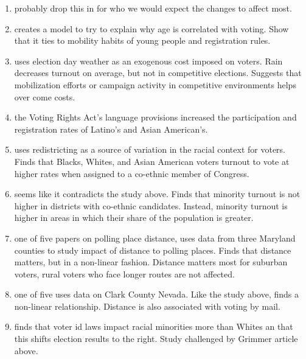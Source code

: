 \documentclass[12pt]{article}
\begin{document}
\begin{enumerate}
\item \citet{verba1995voice} probably drop this in for who we would expect the changes to affect most. 

\item \citet{ansolabehere2012movers} creates a model to try to explain why age is correlated with voting. Show that it ties to mobility habits of young people and registration rules. 

\item \citet{fraga2010voting} uses election day weather as an exogenous cost imposed on voters. Rain decreases turnout on average, but not in competitive elections. Suggests that mobilization efforts or campaign activity in competitive environments helps over come costs. 

\item \citet{fraga2016examining} the Voting Rights Act's language provisions increased the participation and registration rates of Latino's and Asian American's. 

\item \citet{fraga2016redistricting} uses redistricting as a source of variation in the racial context for voters. Finds that Blacks, Whites, and Asian American voters turnout to vote at higher rates when assigned to a co-ethnic member of Congress. 

\item \citet{fraga2016candidates} seems like it contradicts the study above. Finds that minority turnout is not higher in districts with co-ethnic candidates. Instead, minority turnout is higher in areas in which their share of the population is greater. 

\item \citet{gimpel2003political} one of five papers on polling place distance, uses data from three Maryland counties to study impact of distance to polling places. Finds that distance matters, but in a non-linear fashion. Distance matters most for suburban voters, rural voters who face longer routes are not affected. 

\item \citet{dyck2005distance} one of five uses data on Clark County Nevada. Like the study above, finds a non-linear relationship. Distance is also associated with voting by mail. 

\item \citet{hajnal2017voter} finds that voter id laws impact racial minorities more than Whites an that this shifts election results to the right. Study challenged by Grimmer article above. 


\end{enumerate}
\end{document}
